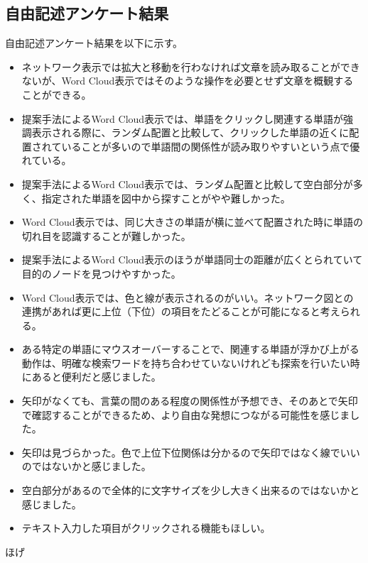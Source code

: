 \documentclass[syuuron]{kuee}
\begin{document}
		\subsection{自由記述アンケート結果}
		自由記述アンケート結果を以下に示す。
		\begin{itemize}
			\item ネットワーク表示では拡大と移動を行わなければ文章を読み取ることができないが、Word Cloud表示ではそのような操作を必要とせず文章を概観することができる。
			\item 提案手法によるWord Cloud表示では、単語をクリックし関連する単語が強調表示される際に、ランダム配置と比較して、クリックした単語の近くに配置されていることが多いので単語間の関係性が読み取りやすいという点で優れている。
			\item 提案手法によるWord Cloud表示では、ランダム配置と比較して空白部分が多く、指定された単語を図中から探すことがやや難しかった。
			\item Word Cloud表示では、同じ大きさの単語が横に並べて配置された時に単語の切れ目を認識することが難しかった。
			\item 提案手法によるWord Cloud表示のほうが単語同士の距離が広くとられていて目的のノードを見つけやすかった。
			\item Word Cloud表示では、色と線が表示されるのがいい。ネットワーク図との連携があれば更に上位（下位）の項目をたどることが可能になると考えられる。
			\item ある特定の単語にマウスオーバーすることで、関連する単語が浮かび上がる動作は、明確な検索ワードを持ち合わせていないけれども探索を行いたい時にあると便利だと感じました。
			\item 矢印がなくても、言葉の間のある程度の関係性が予想でき、そのあとで矢印で確認することができるため、より自由な発想につながる可能性を感じました。
			\item 矢印は見づらかった。色で上位下位関係は分かるので矢印ではなく線でいいのではないかと感じました。
			\item 空白部分があるので全体的に文字サイズを少し大きく出来るのではないかと感じました。
			\item テキスト入力した項目がクリックされる機能もほしい。
		\end{itemize}
	


\begin{acknowledgements}
	ほげ
\end{acknowledgements}
\end{document}
